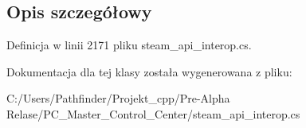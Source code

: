 \subsection{Opis szczegółowy}


Definicja w linii 2171 pliku steam\+\_\+api\+\_\+interop.\+cs.



Dokumentacja dla tej klasy została wygenerowana z pliku\+:\begin{DoxyCompactItemize}
\item 
C\+:/\+Users/\+Pathfinder/\+Projekt\+\_\+cpp/\+Pre-\/\+Alpha Relase/\+P\+C\+\_\+\+Master\+\_\+\+Control\+\_\+\+Center/steam\+\_\+api\+\_\+interop.\+cs\end{DoxyCompactItemize}
